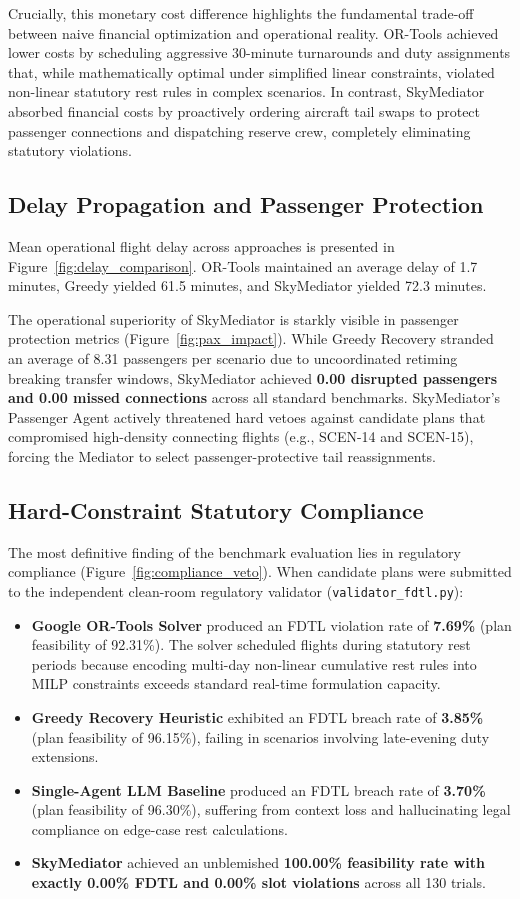 Crucially, this monetary cost difference highlights the fundamental trade-off between naive financial optimization and operational reality. OR-Tools achieved lower costs by scheduling aggressive 30-minute turnarounds and duty assignments that, while mathematically optimal under simplified linear constraints, violated non-linear statutory rest rules in complex scenarios. In contrast, SkyMediator absorbed financial costs by proactively ordering aircraft tail swaps to protect passenger connections and dispatching reserve crew, completely eliminating statutory violations.

\subsection{Delay Propagation and Passenger Protection}
Mean operational flight delay across approaches is presented in Figure~\ref{fig:delay_comparison}. OR-Tools maintained an average delay of 1.7 minutes, Greedy yielded 61.5 minutes, and SkyMediator yielded 72.3 minutes. 

The operational superiority of SkyMediator is starkly visible in passenger protection metrics (Figure~\ref{fig:pax_impact}). While Greedy Recovery stranded an average of 8.31 passengers per scenario due to uncoordinated retiming breaking transfer windows, SkyMediator achieved \textbf{0.00 disrupted passengers and 0.00 missed connections} across all standard benchmarks. SkyMediator's Passenger Agent actively threatened hard vetoes against candidate plans that compromised high-density connecting flights (e.g., SCEN-14 and SCEN-15), forcing the Mediator to select passenger-protective tail reassignments.

\subsection{Hard-Constraint Statutory Compliance}
The most definitive finding of the benchmark evaluation lies in regulatory compliance (Figure~\ref{fig:compliance_veto}). When candidate plans were submitted to the independent clean-room regulatory validator (\texttt{validator\_fdtl.py}):
\begin{itemize}
    \item \textbf{Google OR-Tools Solver} produced an FDTL violation rate of \textbf{7.69\%} (plan feasibility of 92.31\%). The solver scheduled flights during statutory rest periods because encoding multi-day non-linear cumulative rest rules into MILP constraints exceeds standard real-time formulation capacity.
    \item \textbf{Greedy Recovery Heuristic} exhibited an FDTL breach rate of \textbf{3.85\%} (plan feasibility of 96.15\%), failing in scenarios involving late-evening duty extensions.
    \item \textbf{Single-Agent LLM Baseline} produced an FDTL breach rate of \textbf{3.70\%} (plan feasibility of 96.30\%), suffering from context loss and hallucinating legal compliance on edge-case rest calculations.
    \item \textbf{SkyMediator} achieved an unblemished \textbf{100.00\% feasibility rate with exactly 0.00\% FDTL and 0.00\% slot violations} across all 130 trials.
\end{itemize}

